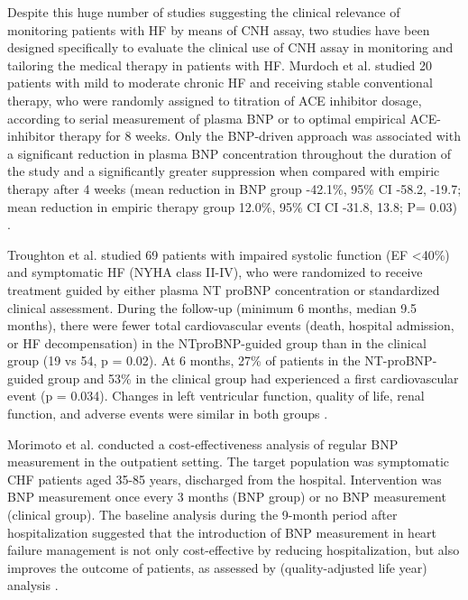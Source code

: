 \documentclass[14pt,a4paper,onecolumn]{extarticle}
\begin{document}
Despite this huge number of studies suggesting the clinical relevance of monitoring patients with HF by means of CNH assay, two studies \citep{bib3252} \citep{bib3253} have been designed specifically to evaluate the clinical use of CNH assay in monitoring and tailoring the medical therapy in patients with HF.
Murdoch et al. \citep{bib3252} studied 20 patients with mild to moderate chronic HF and receiving stable conventional therapy, who were randomly assigned to titration of ACE inhibitor dosage, according to serial measurement of plasma BNP or to optimal empirical ACE-inhibitor therapy for 8 weeks. Only the BNP-driven approach was associated with a significant reduction in plasma BNP concentration throughout the duration of the study and a significantly greater suppression when compared with empiric therapy after 4 weeks (mean reduction in BNP group -42.1\%, 95\% CI -58.2, -19.7; mean reduction in empiric therapy group  12.0\%, 95\% CI CI -31.8, 13.8; P= 0.03) \citep{bib3252}.

Troughton et al. studied 69 patients with impaired systolic function (EF <40\%) and symptomatic HF (NYHA class II-IV), who were randomized to receive treatment guided by either plasma NT proBNP concentration or standardized clinical assessment. During the follow-up (minimum 6 months, median 9.5 months), there were fewer total cardiovascular events (death, hospital admission, or HF decompensation) in the NTproBNP-guided group than in the clinical group (19 vs 54, p = 0.02). At 6 months, 27\% of patients in the NT-proBNP-guided group and 53\% in the clinical group had experienced a first cardiovascular event (p = 0.034). Changes in left ventricular function, quality of life, renal function, and adverse events were similar in both groups \citep{bib3253}.

Morimoto et al. conducted a cost-effectiveness analysis of regular BNP measurement in the outpatient setting. The target population was symptomatic CHF patients aged 35-85 years,  discharged from the hospital. Intervention was BNP measurement once every 3 months (BNP group) or no BNP measurement (clinical group). The baseline analysis during the 9-month period after hospitalization suggested that the introduction of BNP measurement in heart failure management is not only cost-effective by reducing hospitalization, but also improves the outcome of patients, as assessed by (quality-adjusted life year) analysis \citep{bib3263}.
\end{document}
